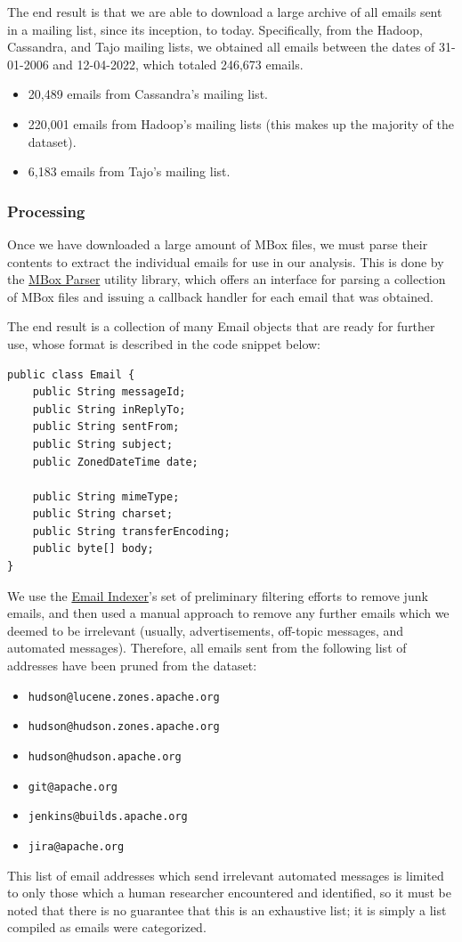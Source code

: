 \documentclass[a4paper, 12pt]{article}
\begin{document}
			The end result is that we are able to download a large archive of all emails sent in a mailing list, since its inception, to today. Specifically, from the Hadoop, Cassandra, and Tajo mailing lists, we obtained all emails between the dates of 31-01-2006 and 12-04-2022, which totaled 246,673 emails.
			
			\begin{itemize}
				\item 20,489 emails from Cassandra's mailing list.
				\item 220,001 emails from Hadoop's mailing lists (this makes up the majority of the dataset).
				\item 6,183 emails from Tajo's mailing list.
			\end{itemize}
			
		\subsubsection{Processing}
			Once we have downloaded a large amount of MBox files, we must parse their contents to extract the individual emails for use in our analysis. This is done by the \hyperref[sec:mbox-parser]{MBox Parser} utility library, which offers an interface for parsing a collection of MBox files and issuing a callback handler for each email that was obtained.
			
			The end result is a collection of many Email objects that are ready for further use, whose format is described in the code snippet below:
			\begin{verbatim}
public class Email {
	public String messageId;
	public String inReplyTo;
	public String sentFrom;
	public String subject;
	public ZonedDateTime date;
	
	public String mimeType;
	public String charset;
	public String transferEncoding;
	public byte[] body;
}
			\end{verbatim}
		
			We use the \hyperref[sec:email-indexer]{Email Indexer}'s set of preliminary filtering efforts to remove junk emails, and then used a manual approach to remove any further emails which we deemed to be irrelevant (usually, advertisements, off-topic messages, and automated messages). Therefore, all emails sent from the following list of addresses have been pruned from the dataset:
			\begin{itemize}
				\item \texttt{hudson@lucene.zones.apache.org}
				\item \texttt{hudson@hudson.zones.apache.org}
				\item \texttt{hudson@hudson.apache.org}
				\item \texttt{git@apache.org}
				\item \texttt{jenkins@builds.apache.org}
				\item \texttt{jira@apache.org}
			\end{itemize}
			This list of email addresses which send irrelevant automated messages is limited to only those which a human researcher encountered and identified, so it must be noted that there is no guarantee that this is an exhaustive list; it is simply a list compiled as emails were categorized.
		
\end{document}
